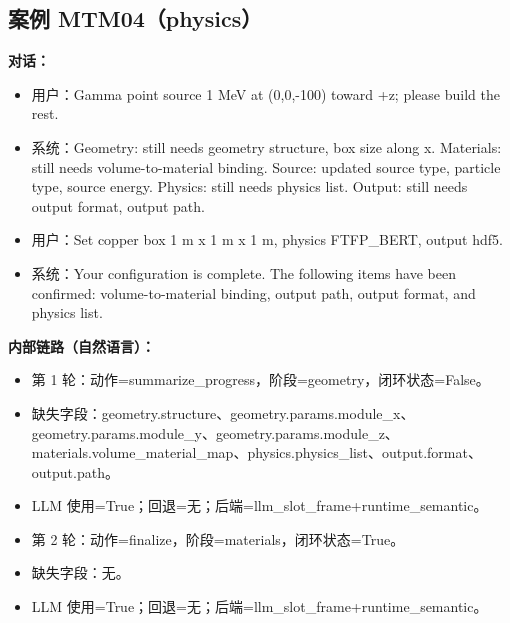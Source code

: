 \documentclass[11pt]{ctexart}
\begin{document}
\subsection{案例 MTM04（physics）}
\textbf{对话：}
\begin{itemize}
\item 用户：Gamma point source 1 MeV at (0,0,-100) toward +z; please build the rest.
\item 系统：Geometry: still needs geometry structure, box size along x. Materials: still needs volume-to-material binding. Source: updated source type, particle type, source energy. Physics: still needs physics list. Output: still needs output format, output path.
\item 用户：Set copper box 1 m x 1 m x 1 m, physics FTFP\_BERT, output hdf5.
\item 系统：Your configuration is complete. The following items have been confirmed: volume-to-material binding, output path, output format, and physics list.
\end{itemize}
\textbf{内部链路（自然语言）：}
\begin{itemize}
\item 第 1 轮：动作=summarize\_progress，阶段=geometry，闭环状态=False。
\item 缺失字段：geometry.structure、geometry.params.module\_x、geometry.params.module\_y、geometry.params.module\_z、materials.volume\_material\_map、physics.physics\_list、output.format、output.path。
\item LLM 使用=True；回退=无；后端=llm\_slot\_frame+runtime\_semantic。
\item 第 2 轮：动作=finalize，阶段=materials，闭环状态=True。
\item 缺失字段：无。
\item LLM 使用=True；回退=无；后端=llm\_slot\_frame+runtime\_semantic。
\end{itemize}
\end{document}
